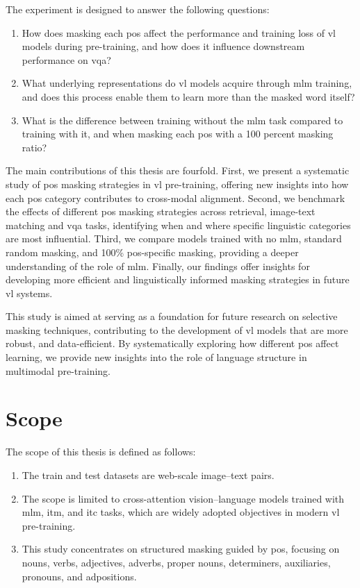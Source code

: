 The experiment is designed to answer the following questions:
\begin{enumerate}  
    \item How does masking each \acrshort{pos} affect the performance and training loss of \acrshort{vl} models during pre-training, and how does it influence downstream performance on \acrfull{vqa}?
    \item What underlying representations do \acrshort{vl} models acquire through \acrshort{mlm} training, and does this process enable them to learn more than the masked word itself?
    \item What is the difference between training without the \acrshort{mlm} task compared to training with it, and when masking each \acrshort{pos} with a 100 percent masking ratio?
\end{enumerate}

The main contributions of this thesis are fourfold.
First, we present a systematic study of \acrshort{pos} masking strategies in \acrshort{vl} pre-training, offering new insights into how each \acrshort{pos} category contributes to cross-modal alignment.  
Second, we benchmark the effects of different \acrshort{pos} masking strategies across retrieval, image-text matching and \acrshort{vqa} tasks, identifying when and where specific linguistic categories are most influential.  
Third, we compare models trained with no \acrshort{mlm}, standard random masking, and 100\% \acrshort{pos}-specific masking, providing a deeper understanding of the role of \acrshort{mlm}.  
Finally, our findings offer insights for developing more efficient and linguistically informed masking strategies in future \acrshort{vl} systems.  

This study is aimed at serving as a foundation for future research on selective masking techniques, contributing to the development of \acrshort{vl} models that are more robust, and data-efficient.
By systematically exploring how different \acrshort{pos} affect learning, we provide new insights into the role of language structure in multimodal pre-training.

\section{Scope}  
The scope of this thesis is defined as follows:  
\begin{enumerate}  
    \item The train and test datasets are web-scale image–text pairs.  
    \item The scope is limited to cross-attention vision–language models trained with \acrshort{mlm}, \acrshort{itm}, and \acrshort{itc} tasks, which are widely adopted objectives in modern \acrshort{vl} pre-training.
    \item This study concentrates on structured masking guided by \acrshort{pos}, focusing on nouns, verbs, adjectives, adverbs, proper nouns, determiners, auxiliaries, pronouns, and adpositions.
\end{enumerate}  